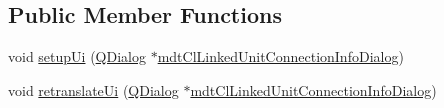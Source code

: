 \subsection*{Public Member Functions}
\begin{DoxyCompactItemize}
\item 
void \hyperlink{class_ui__mdt_cl_linked_unit_connection_info_dialog_a355e2c86a676bd85415f4f585128d114}{setup\-Ui} (\hyperlink{class_q_dialog}{Q\-Dialog} $\ast$\hyperlink{classmdt_cl_linked_unit_connection_info_dialog}{mdt\-Cl\-Linked\-Unit\-Connection\-Info\-Dialog})
\item 
void \hyperlink{class_ui__mdt_cl_linked_unit_connection_info_dialog_ad4e522702b7a97bea7969671c728f4d8}{retranslate\-Ui} (\hyperlink{class_q_dialog}{Q\-Dialog} $\ast$\hyperlink{classmdt_cl_linked_unit_connection_info_dialog}{mdt\-Cl\-Linked\-Unit\-Connection\-Info\-Dialog})
\end{DoxyCompactItemize}

